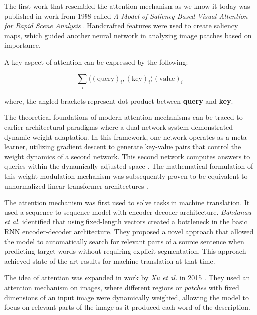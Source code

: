 The first work that resembled the attention mechanism as we know it today was published in work from 1998 called \textit{A Model of Saliency-Based Visual Attention for Rapid Scene Analysis} \cite{730558}. Handcrafted features were used to create saliency maps, which guided another neural network in analyzing image patches based on importance. 

A key aspect of attention can be expressed by the following:

\begin{equation}
\sum_{i} \langle (\text{query})_i, (\text{key})_i \rangle (\text{value})_i
\end{equation}

where, the angled brackets represent dot product between \textbf{query} and \textbf{key}. 

The theoretical foundations of modern attention mechanisms can be traced to earlier architectural paradigms where a dual-network system demonstrated dynamic weight adaptation. In this framework, one network operates as a meta-learner, utilizing gradient descent to generate key-value pairs that control the weight dynamics of a second network. This second network computes answers to queries within the dynamically adjusted space \cite{hinton1987using, ha2016hypernetworks, fastweight}. The mathematical formulation of this weight-modulation mechanism was subsequently proven to be equivalent to unnormalized linear transformer architectures \cite{schlag2021linear}.
\newline

The attention mechanism was first used to solve tasks in machine translation. It used a sequence-to-sequence model with encoder-decoder architecture. \textit{Bahdanau et al.} \cite{bahdanau2014neural} identified that using fixed-length vectors created a bottleneck in the basic RNN encoder-decoder architecture. They proposed a novel approach that allowed the model to automatically search for relevant parts of a source sentence when predicting target words without requiring explicit segmentation. This approach achieved state-of-the-art results for machine translation at that time.

The idea of attention was expanded in work by \textit{Xu et al.} in 2015 \cite{pmlr-v37-xuc15}. They used an attention mechanism on images, where different regions or \textit{patches} with fixed dimensions of an input image were dynamically weighted, allowing the model to focus on relevant parts of the image as it produced each word of the description. 


